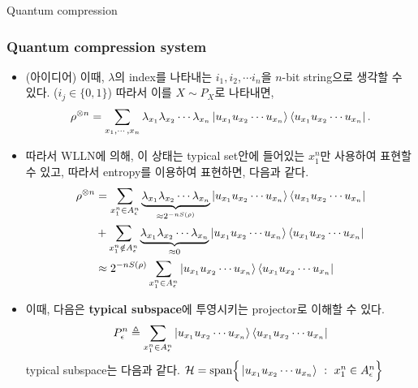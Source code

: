 \documentclass[9pt]{beamer}
\begin{document}
\begin{section}{Quantum compression}
        \begin{frame}
            \frametitle{Quantum compression system}
            \begin{itemize}
                \item (아이디어) 이때, $\lambda$의 index를 나타내는 $i_1, i_2, \cdots i_n$을 $n$-bit string으로 생각할 수 있다. ($i_j \in \{0, 1\}$) 따라서 이를 $X \sim P_X$로 나타내면,
                \begin{equation*}
                    \rho^{\otimes n} = \sum_{x_1, \cdots, x_n} \lambda_{x_1} \lambda_{x_2} \cdots \lambda_{x_n} \ket{u_{x_1} u_{x_2} \cdots u_{x_n}}\bra{u_{x_1} u_{x_2} \cdots u_{x_n}}.
                \end{equation*}
                \item 따라서 WLLN에 의해, 이 상태는 typical set안에 들어있는 $x_1^n$만 사용하여 표현할 수 있고, 따라서 entropy를 이용하여 표현하면, 다음과 같다.
                \begin{align*}
                    \rho^{\otimes n}    &= \sum_{x_1^n \in A^{n}_\epsilon} \underbrace{\lambda_{x_1} \lambda_{x_2} \cdots \lambda_{x_n}}_{\approx 2^{-n S(\rho)}} \ket{u_{x_1} u_{x_2} \cdots u_{x_n}}\bra{u_{x_1} u_{x_2} \cdots u_{x_n}} \\
                                        &+  \sum_{x_1^n \notin A^{n}_\epsilon} \underbrace{\lambda_{x_1} \lambda_{x_2} \cdots \lambda_{x_n}}_{\approx 0} \ket{u_{x_1} u_{x_2} \cdots u_{x_n}}\bra{u_{x_1} u_{x_2} \cdots u_{x_n}}  \\
                                        &\approx 2^{-n S(\rho)}  \sum_{x_1^n \in A^{n}_\epsilon}  \ket{u_{x_1} u_{x_2} \cdots u_{x_n}}\bra{u_{x_1} u_{x_2} \cdots u_{x_n}}
                \end{align*}
                \item 이때, 다음은 \textbf{typical subspace}에 투영시키는 projector로 이해할 수 있다.
                \begin{equation*}
                    P_\epsilon^n \triangleq \sum_{x_1^n \in A^{n}_\epsilon}  \ket{u_{x_1} u_{x_2} \cdots u_{x_n}}\bra{u_{x_1} u_{x_2} \cdots u_{x_n}}
                \end{equation*}
                typical subspace는 다음과 같다.
                $ \mathcal H = \text{span} \Big\{ \ket{u_{x_1}u_{x_2} \cdots u_{x_n}} \ : \ x_1^n \in A_\epsilon^n \Big\} $
            \end{itemize}
        \end{frame}


\end{section}
\end{document}
